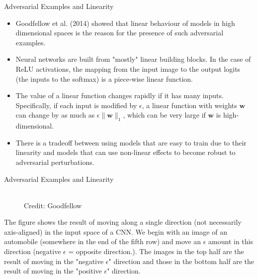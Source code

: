 \begin{vbframe} {Adversarial Examples and Linearity}
  \begin{itemize}
    \item Goodfellow et al. (2014) showed that linear behaviour of models in high dimensional spaces is the reason for the presence of such adversarial examples.
    \item Neural networks are built from "mostly" linear building blocks. In the case of ReLU activations, the mapping from the input image to the output logits (the inputs to the softmax) is a piece-wise linear function.
    \item The value of a linear function changes rapidly if it has many inputs. Specifically, if each input is modified by $\epsilon$, a linear function with weights $\mathbf{w}$ can change by as much as $\epsilon \lVert \mathbf{w} \rVert_1$, which can be very large if $\mathbf{w}$ is high-dimensional.
    \item There is a tradeoff between using models that are easy to train due to their linearity and models that can use non-linear effects to become robust to adversarial perturbations. 
  \end{itemize}
\end{vbframe}

\begin{frame} {Adversarial Examples and Linearity}
  \begin{figure}
    \centering
      \tiny{\\Credit: Goodfellow}
  \end{figure}
  \footnotesize{The figure shows the result of moving along a single direction (not necessarily axis-aligned) in the input space of a CNN. We begin with an image of an automobile (somewhere in the end of the fifth row) and move an $\epsilon$ amount in this direction (negative $\epsilon$ = opposite direction.). The images in the top half are the result of moving in the "negative $\epsilon$" direction and those in the bottom half are the result of moving in the "positive $\epsilon$" direction.}
\end{frame}

